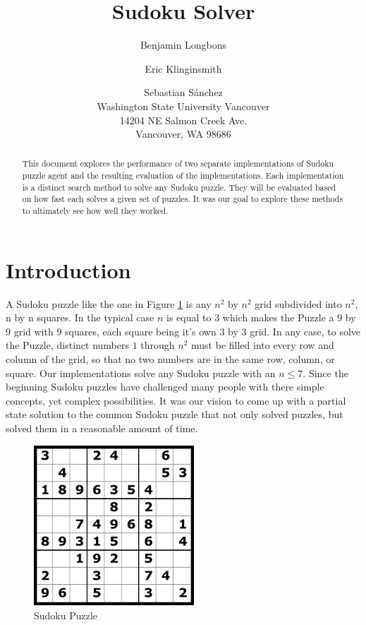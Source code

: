 \documentclass[letterpaper]{article}
\begin{document}
\title{Sudoku Solver}
\author{
	Benjamin Longbons\and
    Eric Klinginsmith \and
    Sebastian S\'{a}nchez \\
Washington State University Vancouver \\
14204 NE Salmon Creek Ave. \\
Vancouver, WA 98686
}

\maketitle
\begin{abstract}
This document explores the performance of two separate implementations of Sudoku puzzle agent and the resulting evaluation of the implementations. Each implementation is a distinct search method to solve any Sudoku puzzle. They will be evaluated based on how fast each solves a given set of puzzles. It was our goal to explore these methods to ultimately see how well they worked.
\end{abstract}

\section{Introduction}
A Sudoku puzzle like the one in Figure \ref{fig:sudoku-puzzle} is any $ n^{2} $ by $ n^{2} $ grid subdivided into $ n^{2} $, n by n squares. In the typical case $ n $ is equal to $3$ which makes the Puzzle a $9$ by $9$ grid with $9$ squares, each square being it's own $3$ by $3$ grid. In any case, to solve the Puzzle, distinct numbers $1$ through $ n^{2} $ must be filled into every row and column of the grid, so that no two numbers are in the same row, column, or square. Our implementations solve any Sudoku puzzle with an $n \le 7$. Since the beginning Sudoku puzzles have challenged many people with there simple concepts, yet complex possibilities. It was our vision to come up with a partial state solution to the common Sudoku puzzle that not only solved puzzles, but solved them in a reasonable amount of time.

\begin{figure}[h]
	\centering
	\includegraphics[width=60mm]{./Sudoku-games.png}
	\caption{Sudoku Puzzle}
	\label{fig:sudoku-puzzle}
\end{figure}
\end{document}
